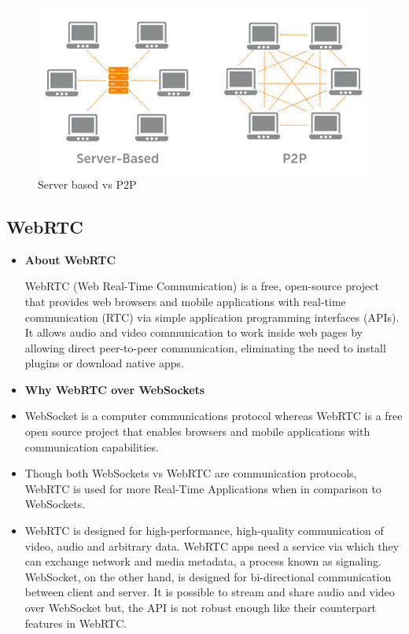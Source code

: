 \documentclass{fisatproject}
\begin{document}
	\begin{center}
		\begin{figure}[h]
			
			\includegraphics[scale=.75]{svp.jpg}
			\caption{Server based vs P2P}
			
		\end{figure}
	\end{center}
\newpage
	\subsection{WebRTC}

\begin{itemize}
	\item \textbf{About WebRTC}
	
	WebRTC (Web Real-Time Communication) is a free, open-source project that provides web browsers and mobile applications with real-time communication (RTC) via simple application programming interfaces (APIs). It allows audio and video communication to work inside web pages by allowing direct peer-to-peer communication, eliminating the need to install plugins or download native apps.
	
	\item \textbf{Why WebRTC over WebSockets}
		\item WebSocket is a computer communications protocol whereas WebRTC is a free open source project that enables browsers and mobile applications with communication capabilities.
		\item Though both WebSockets vs WebRTC are communication protocols, WebRTC is used for more Real-Time Applications when in comparison to WebSockets.
		\item WebRTC is designed for high-performance, high-quality communication of video, audio and arbitrary data. WebRTC apps need a service via which they can exchange network and media metadata, a process known as signaling. WebSocket, on the other hand, is designed for bi-directional communication between client and server. It is possible to stream and share audio and video over WebSocket but, the API is not robust enough like their counterpart features in WebRTC.
	

	
\end{itemize}
\end{document}
